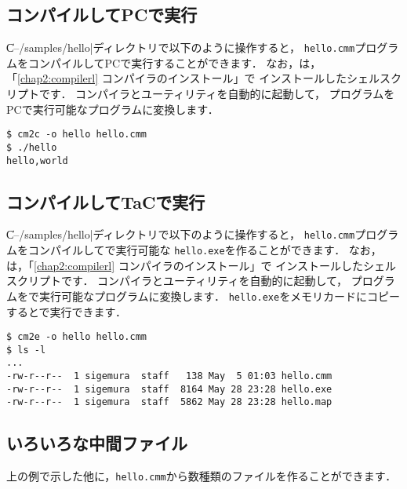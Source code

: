 \subsection{コンパイルしてPCで実行}

\|C--/samples/hello|ディレクトリで以下のように操作すると，
{\tt hello.cmm}プログラムをコンパイルしてPCで実行することができます．
なお，{\cmc}は，「\ref{chap2:compilerl} コンパイラのインストール」で
インストールしたシェルスクリプトです．
コンパイラとユーティリティを自動的に起動して，
{\cmml}プログラムをPCで実行可能なプログラムに変換します．

\begin{mylist}
\begin{verbatim}
$ cm2c -o hello hello.cmm 
$ ./hello
hello,world
\end{verbatim}
\end{mylist}

\subsection{コンパイルしてTaCで実行}

\|C--/samples/hello|ディレクトリで以下のように操作すると，
{\tt hello.cmm}プログラムをコンパイルして{\tac}で実行可能な
{\tt hello.exe}を作ることができます．
なお，{\cme}は，「\ref{chap2:compilerl} コンパイラのインストール」で
インストールしたシェルスクリプトです．
コンパイラとユーティリティを自動的に起動して，
{\cmml}プログラムを{\tac}で実行可能なプログラムに変換します．
{\tt hello.exe}をメモリカードにコピーすると{\tac}で実行できます．

\begin{mylist}
\begin{verbatim}
$ cm2e -o hello hello.cmm 
$ ls -l
...
-rw-r--r--  1 sigemura  staff   138 May  5 01:03 hello.cmm
-rw-r--r--  1 sigemura  staff  8164 May 28 23:28 hello.exe
-rw-r--r--  1 sigemura  staff  5862 May 28 23:28 hello.map
\end{verbatim}
\end{mylist}

\subsection{いろいろな中間ファイル}

上の例で示した他に，{\tt hello.cmm}から数種類のファイルを作ることができます．


